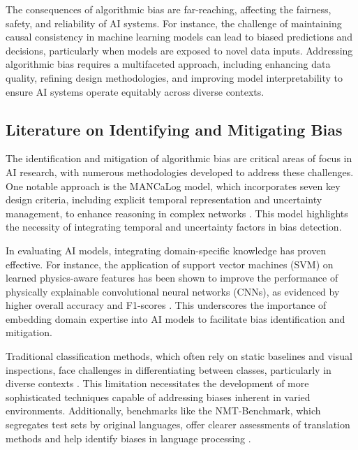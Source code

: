 The consequences of algorithmic bias are far-reaching, affecting the fairness, safety, and reliability of AI systems. For instance, the challenge of maintaining causal consistency in machine learning models can lead to biased predictions and decisions, particularly when models are exposed to novel data inputs. Addressing algorithmic bias requires a multifaceted approach, including enhancing data quality, refining design methodologies, and improving model interpretability to ensure AI systems operate equitably across diverse contexts.


\subsection{Literature on Identifying and Mitigating Bias} \label{subsec:Literature on Identifying and Mitigating Bias}

The identification and mitigation of algorithmic bias are critical areas of focus in AI research, with numerous methodologies developed to address these challenges. One notable approach is the MANCaLog model, which incorporates seven key design criteria, including explicit temporal representation and uncertainty management, to enhance reasoning in complex networks \cite{shakarian2022reasoningcomplexnetworkslogic}. This model highlights the necessity of integrating temporal and uncertainty factors in bias detection.



In evaluating AI models, integrating domain-specific knowledge has proven effective. For instance, the application of support vector machines (SVM) on learned physics-aware features has been shown to improve the performance of physically explainable convolutional neural networks (CNNs), as evidenced by higher overall accuracy and F1-scores \cite{huang2022physicallyexplainablecnnsar}. This underscores the importance of embedding domain expertise into AI models to facilitate bias identification and mitigation.



Traditional classification methods, which often rely on static baselines and visual inspections, face challenges in differentiating between classes, particularly in diverse contexts \cite{sabanayagam2023unveilinghessiansconnectiondecision}. This limitation necessitates the development of more sophisticated techniques capable of addressing biases inherent in varied environments. Additionally, benchmarks like the NMT-Benchmark, which segregates test sets by original languages, offer clearer assessments of translation methods and help identify biases in language processing \cite{bogoychev2020domaintranslationesenoisesynthetic}.




